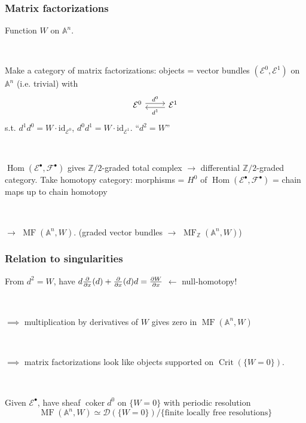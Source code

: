 \documentclass{beamer}
\DeclareMathOperator{\coker}{coker}
\DeclareMathOperator{\Hom}{Hom}
\DeclareMathOperator{\Crit}{Crit}
\DeclareMathOperator{\MF}{MF}
\newcommand{\A}{\mathbb{A}}
\newcommand{\Z}{\mathbb{Z}}
\newcommand{\calD}{\mathcal{D}}
\newcommand{\calE}{\mathcal{E}}
\newcommand{\calF}{\mathcal{F}}
\newcommand{\id}{\mathrm{id}}
\begin{document}
\begin{frame}
    \frametitle{Matrix factorizations}

    Function $W$ on $\A^n$. \pause

    ~

    Make a category of matrix factorizations: \pause objects = vector bundles
    $(\calE^0,\calE^1)$ on $\A^n$ (i.e. trivial) with
    \begin{equation*}
        \begin{tikzcd}[ampersand replacement=\&]
            \calE^0 \ar[r,shift left,"d^0"] \&
            \calE^1 \ar[l,shift left,"d^1"]
        \end{tikzcd}
    \end{equation*}
    s.t. $d^1d^0=W\cdot\id_{\calE^0}$, $d^0d^1 = W\cdot\id_{\calE^1}$.
    ``$d^2=W$'' \pause

    ~

    $\Hom(\calE^\bullet,\calF^\bullet)$ gives $\Z/2$-graded total complex
    $\to$ differential $\Z/2$-graded category. \pause Take homotopy category:
    morphisms = $H^0$ of $\Hom(\calE^\bullet,\calF^\bullet)$ = chain maps up to
    chain homotopy \pause

    ~

    $\to$ $\MF(\A^n,W)$. \pause (graded vector bundles $\to$ $\MF_\Z(\A^n,W)$)
\end{frame}

\begin{frame}
    \frametitle{Relation to singularities}

    From $d^2=W$, have $d\pdv{}{x}(d)+\pdv{}{x}(d)d=\pdv{W}{x}$
    \pause $\leftarrow$ null-homotopy! \pause

    ~

    $\implies$ multiplication by derivatives of $W$ gives zero in $\MF(\A^n,W)$
    \pause

    ~

    $\implies$ matrix factorizations look like objects supported on
    $\Crit(\{W=0\})$. \pause

    ~

    Given $\calE^\bullet$, have sheaf $\coker d^0$ on $\{W=0\}$ with periodic
    resolution \pause
    \begin{equation*}
        \MF(\A^n,W) \simeq \calD(\{W=0\})
            / \{\text{finite locally free resolutions}\}
    \end{equation*}
\end{frame}
\end{document}
